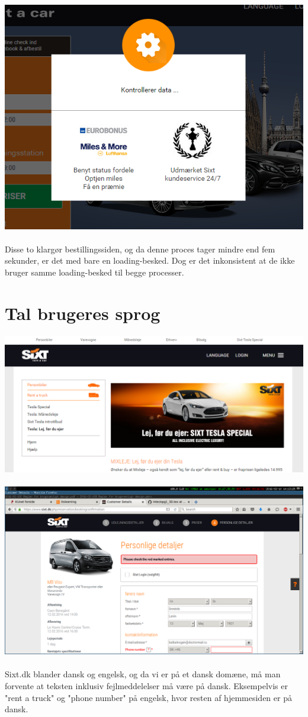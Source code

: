 \documentclass[12pt]{article}
\begin{document}
\includegraphics[scale=0.8]{img/Kontrollerer_Data}
\\
\\
Disse to klargør bestillingssiden, og da denne proces tager mindre end fem sekunder, er det med bare en loading-besked. Dog er det inkonsistent at de ikke bruger samme loading-besked til begge processer.

\section{Tal brugeres sprog}
\includegraphics[scale=0.5]{img/Blande_Engelsk_Dansk}
\\
\\
\includegraphics[scale=0.3]{img/CheckRedMarks}
\\
\\
Sixt.dk blander dansk og engelsk, og da vi er på et dansk domæne, må man forvente at teksten inklusiv fejlmeddelelser må være på dansk. Eksempelvis er "rent a truck" og "phone number" på engelsk, hvor resten af hjemmesiden er på dansk.
\end{document}
